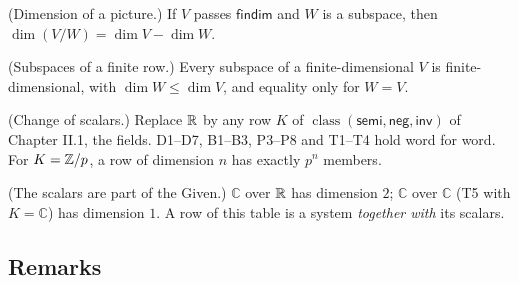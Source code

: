 \begin{lines}
\item[\lab{T3}] (Dimension of a picture.) If $V$ passes $\mathsf{findim}$ and $W$ is a subspace, then $\dim (V/W) = \dim V - \dim W$.
\item[\lab{T4}] (Subspaces of a finite row.) Every subspace of a finite-dimensional $V$ is finite-dimensional, with $\dim W \le \dim V$, and equality only for $W = V$.
\item[\lab{T5}] (Change of scalars.) Replace $\mathbb{R}$ by any row $K$ of $\operatorname{class}(\mathsf{semi}, \mathsf{neg}, \mathsf{inv})$ of Chapter II.1, the fields. D1--D7, B1--B3, P3--P8 and T1--T4 hold word for word. For $K = \mathbb{Z}/p$, a row of dimension $n$ has exactly $p^n$ members.
\item[\lab{T6}] (The scalars are part of the Given.) $\mathbb{C}$ over $\mathbb{R}$ has dimension $2$; $\mathbb{C}$ over $\mathbb{C}$ (T5 with $K = \mathbb{C}$) has dimension $1$. A row of this table is a system \emph{together with} its scalars.
\end{lines}

\subsection*{Remarks}

